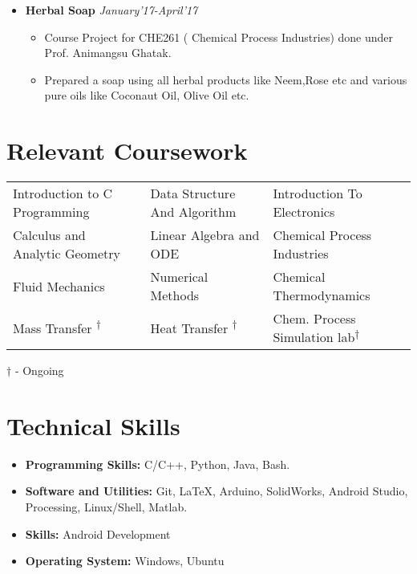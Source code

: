 \documentclass[10pt]{scrbook}
\begin{document}
\begin{itemize}
\begin{itemize}
\end{itemize}
\item \textbf{Herbal Soap} \hfill\textit{January'17-April'17}
\begin{itemize}
\item Course Project for CHE261 ( Chemical Process Industries) done under Prof. Animangsu Ghatak.
\item Prepared a soap using all herbal products like Neem,Rose etc and various pure oils like Coconaut Oil, Olive Oil etc.
\end{itemize}
\end{itemize}


\section*{Relevant Coursework}

\begin{center}
\begin{tabular}{m{5cm}  m{5cm} m{5cm}}

 
 Introduction to C Programming &
  Data Structure And Algorithm &
  Introduction To Electronics\\

 Calculus and Analytic Geometry &
 Linear Algebra and ODE &
 Chemical Process Industries \\
  Fluid Mechanics &
  Numerical Methods &
  Chemical Thermodynamics \\
  Mass Transfer \textsuperscript{$\dagger$}&
  Heat Transfer \textsuperscript{$\dagger$}&
  Chem. Process Simulation lab\textsuperscript{$\dagger$}\\


\end{tabular}

\begin{flushright}
    
    \small{$\dagger$ - Ongoing}
\end{flushright}
\end{center}


\section*{Technical Skills}
\begin{itemize}
\item \textbf{Programming Skills: } C/C++, Python, Java, Bash. 
\item \textbf{Software and Utilities: } Git, \LaTeX, Arduino, SolidWorks, Android Studio, Processing, Linux/Shell, Matlab.
\item \textbf{Skills: } Android Development
\item \textbf{Operating System: } Windows, Ubuntu  
\end{itemize}
\end{document}
